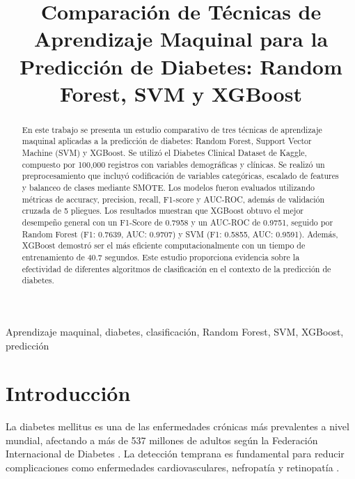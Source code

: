\documentclass[conference]{IEEEtran}
\begin{document}
\title{Comparación de Técnicas de Aprendizaje Maquinal para la Predicción de Diabetes: Random Forest, SVM y XGBoost}

\author{
}

\maketitle

\begin{abstract}
En este trabajo se presenta un estudio comparativo de tres técnicas de aprendizaje maquinal aplicadas a la predicción de diabetes: Random Forest, Support Vector Machine (SVM) y XGBoost. Se utilizó el Diabetes Clinical Dataset de Kaggle, compuesto por 100,000 registros con variables demográficas y clínicas. Se realizó un preprocesamiento que incluyó codificación de variables categóricas, escalado de features y balanceo de clases mediante SMOTE. Los modelos fueron evaluados utilizando métricas de accuracy, precision, recall, F1-score y AUC-ROC, además de validación cruzada de 5 pliegues. Los resultados muestran que XGBoost obtuvo el mejor desempeño general con un F1-Score de 0.7958 y un AUC-ROC de 0.9751, seguido por Random Forest (F1: 0.7639, AUC: 0.9707) y SVM (F1: 0.5855, AUC: 0.9591). Además, XGBoost demostró ser el más eficiente computacionalmente con un tiempo de entrenamiento de 40.7 segundos. Este estudio proporciona evidencia sobre la efectividad de diferentes algoritmos de clasificación en el contexto de la predicción de diabetes.
\end{abstract}

\begin{IEEEkeywords}
Aprendizaje maquinal, diabetes, clasificación, Random Forest, SVM, XGBoost, predicción
\end{IEEEkeywords}

\section{Introducción}

La diabetes mellitus es una de las enfermedades crónicas más prevalentes a nivel mundial, afectando a más de 537 millones de adultos según la Federación Internacional de Diabetes \cite{idf2021}. La detección temprana es fundamental para reducir complicaciones como enfermedades cardiovasculares, nefropatía y retinopatía \cite{who2016}.
\end{document}
